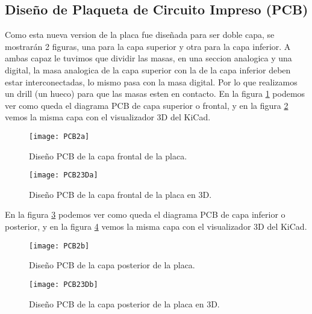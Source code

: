 

\subsection{Diseño de Plaqueta de Circuito Impreso (PCB)}
\label{ subsection: diseño_pcb2}

Como esta nueva version de la placa fue diseñada para ser doble capa, se mostrarán 2 figuras, una para la capa superior y otra para la capa inferior. 
A ambas capaz le tuvimos que dividir las masas, en una seccion analogica y una digital, la masa analogica de la capa superior con la de la capa inferior deben estar interconectadas, lo mismo pasa con la masa digital. Por lo que realizamos un drill (un hueco) para que las masas esten en contacto.
En la figura \ref{fig:PCB2a} podemos ver como queda el diagrama PCB de capa superior o frontal, y en la figura \ref{fig:PCB23Da} vemos la misma capa con el visualizador 3D del KiCad.

\begin{figure}[H]
\centering
  \texttt{[image: PCB2a]}
  \caption{Diseño PCB de la capa frontal de la placa.}\label{fig:PCB2a}
\end{figure}

\begin{figure}  [H]
\centering
  \texttt{[image: PCB23Da]}
  \caption{Diseño PCB de la capa frontal de la placa en 3D.}\label{fig:PCB23Da}
\end{figure}

En la figura \ref{fig:PCB2b} podemos ver como queda el diagrama PCB de capa inferior o posterior, y en la figura \ref{fig:PCB23Db} vemos la misma capa con el visualizador 3D del KiCad.

\begin{figure}[H] 
\centering
  \texttt{[image: PCB2b]}
  \caption{Diseño PCB de la capa posterior de la placa.}\label{fig:PCB2b}
\end{figure}

\begin{figure}  [H]
\centering
  \texttt{[image: PCB23Db]}
  \caption{Diseño PCB de la capa posterior de la placa en 3D.}\label{fig:PCB23Db}
\end{figure}



